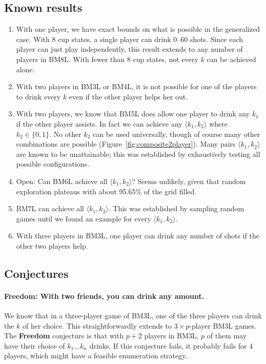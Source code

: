 \documentclass[twocolumn]{article}
\begin{document}
\subsection{Known results}
\begin{enumerate}
  \item With one player, we have exact bounds on what is possible in
    the generalized case. With 8 cup states, a single player can
    drink 0--60 shots. Since each player can just play independently,
    this result extends to any number of players in BM8L. With fewer
    than 8 cup states, not every $k$ can be achieved alone.
  \item With two players in BM3L or BM4L, it is not possible for one
    of the players to drink every $k$ even if the other player helps her
    out.
  \item With two players, we know that BM5L does allow one player to
    drink any $k_1$ if the other player assists. In fact we can
    achieve any $\langle k_1, k_2 \rangle$ where $k_2 \in \{ 0, 1 \}$.
    No other $k_2$ can be used universally, though of course many
    other combinations are possible
    (Figure~\ref{fig:composite2player}). Many pairs $\langle k_1, k_2
    \rangle$ are known to be unattainable; this was established by
    exhaustively testing all possible configurations.
  \item Open: Can BM6L achieve all $\langle k_1, k_2 \rangle$? Seems
    unlikely, given that random exploration plateaus with about 95.65\%
    of the grid filled.
  \item BM7L can achieve all $\langle k_1, k_2 \rangle$. This was
    established by sampling random games until we found an example
    for every $\langle k_1, k_2 \rangle$.
  \item With three players in BM3L, one player can drink any number of
    shots if the other two players help.
\end{enumerate}

\subsection{Conjectures} \label{sec:conjectures}


\paragraph{Freedom: With two friends, you can drink any amount.} We know
that in a three-player game of BM3L, one of the three players can
drink the $k$ of her choice. This straightforwardly extends to $3
\times p$-player BM3L games. The {\bf Freedom} conjecture is that
with $p + 2$ players in BM3L, $p$ of them may have their choice of
$k_1 \ldots k_n$ drinks. If this conjecture fails, it probably fails
for 4 players, which might have a feasible enumeration strategy.
\end{document}
